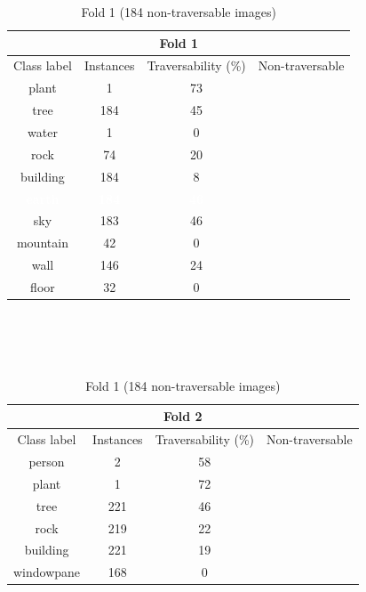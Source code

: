 \documentclass[12pt,a4paper,table,dvipsnames,tikz]{report}
\newcommand{\white}[1]{\textbf{\textcolor{white}{#1}}} %
\begin{document}
	
	
	
	\begin{table}[h!]
		\begin{subtable}[h!]{\textwidth}
			\centering
			\begin{tabular}{|c|c|c|c|}
				\hline
				\multicolumn{4}{|c|}{Fold 1}\\
				\hline
				Class label & Instances & Traversability (\%) & Non-traversable\\
				\hline\hline
				plant & 1 & 73 &\\
				\hline
				\rowcolor{tree}
				tree & 184 & 45 & \checkmark\\
				\hline
				water & 1 & 0 & \checkmark\\
				\hline
				rock & 74 & 20 & \checkmark\\
				\hline
				building & 184 & 8 & \checkmark\\
				\hline
				\rowcolor{earth}
				\white{earth} & \white{184} & \white{46} & \white{\checkmark}\\
				\hline
				\rowcolor{sky}
				sky & 183 & 46 & \checkmark\\
				\hline
				mountain & 42 & 0 & \checkmark\\
				\hline
				wall & 146 & 24 & \checkmark\\
				\hline
				floor & 32 & 0 & \checkmark\\
				\hline
			\end{tabular}
			\caption{Fold 1 (184 non-traversable images)}
			\label{table:obst.f1}
		\end{subtable}
		\\\\\\
		\begin{subtable}[h!]{\textwidth}
			\centering
			\begin{tabular}{|c|c|c|c|}
				\hline
				\multicolumn{4}{|c|}{Fold 2}\\
				\hline
				Class label & Instances & Traversability (\%) & Non-traversable\\
				\hline\hline
				person & 2 & 58 &\\
				\hline
				plant & 1 & 72 &\\
				\hline
				\rowcolor{tree}
				tree & 221 & 46 & \checkmark\\
				\hline
				rock & 219 & 22 & \checkmark\\
				\hline
				building & 221 & 19 & \checkmark\\
				\hline
				windowpane & 168 & 0 & \checkmark\\

\end{tabular}
\end{subtable}
\end{table}
\end{document}
